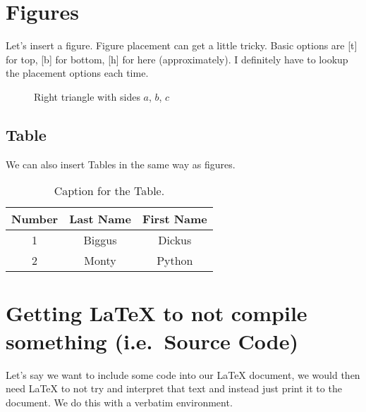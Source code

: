 \documentclass[12pt]{article}
\begin{document}
\section{Figures}

Let's insert a figure. Figure placement can get a little tricky.
Basic options are [t] for top, [b] for bottom, [h] for here (approximately).
I definitely have to lookup the placement options each time.

\begin{figure}[H] %
    \centering %
    \caption{Right triangle with sides $a$, $b$, $c$}
    \label{fig:right-triangle}
\end{figure}

\subsection{Table}
We can also insert Tables in the same way as figures.

\begin{table}[H]
  \caption{Caption for the Table.}
  \begin{tabular}{c|cc}  %
    Number &  Last Name & First Name \\ %
    \hline %
    1 & Biggus & Dickus \\
    2 & Monty & Python
  \end{tabular}
\end{table}

\section{Getting \LaTeX{} to not compile something (i.e.\ Source Code)}
Let's say we want to include some code into our \LaTeX{} document,
we would then need \LaTeX{} to not try and interpret that text and
instead just print it to the document. We do this with a verbatim
environment.
\end{document}

